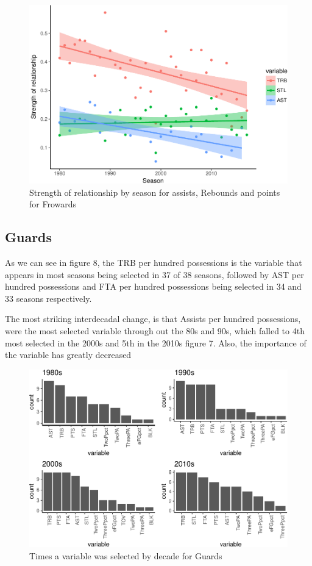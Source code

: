\documentclass[]{elsarticle} %
\makeatletter
\def\maxwidth{\ifdim\Gin@nat@width>\linewidth\linewidth
\else\Gin@nat@width\fi}
\let\Oldincludegraphics\includegraphics
\renewcommand{\includegraphics}[1]{\Oldincludegraphics[width=\maxwidth]{#1}}
\makeatother
\begin{document}
\begin{figure}[htbp]
\centering
\includegraphics{Coaching_Selection_files/figure-latex/unnamed-chunk-12-1.pdf}
\caption{Strength of relationship by season for assists, Rebounds and
points for Frowards}
\end{figure}

\subsection{Guards}\label{guards}

As we can see in figure 8, the TRB per hundred possessions is the
variable that appears in most seasons being selected in 37 of 38
seasons, followed by AST per hundred possessions and FTA per hundred
possessions being selected in 34 and 33 seasons respectively.

The most striking interdecadal change, is that Assists per hundred
possessions, were the most selected variable through out the 80s and
90s, which falled to 4th most selected in the 2000s and 5th in the 2010s
figure 7. Also, the importance of the variable has greatly decreased

\begin{figure}[htbp]
\centering
\includegraphics{Coaching_Selection_files/figure-latex/unnamed-chunk-14-1.pdf}
\caption{Times a variable was selected by decade for Guards}
\end{figure}
\end{document}
